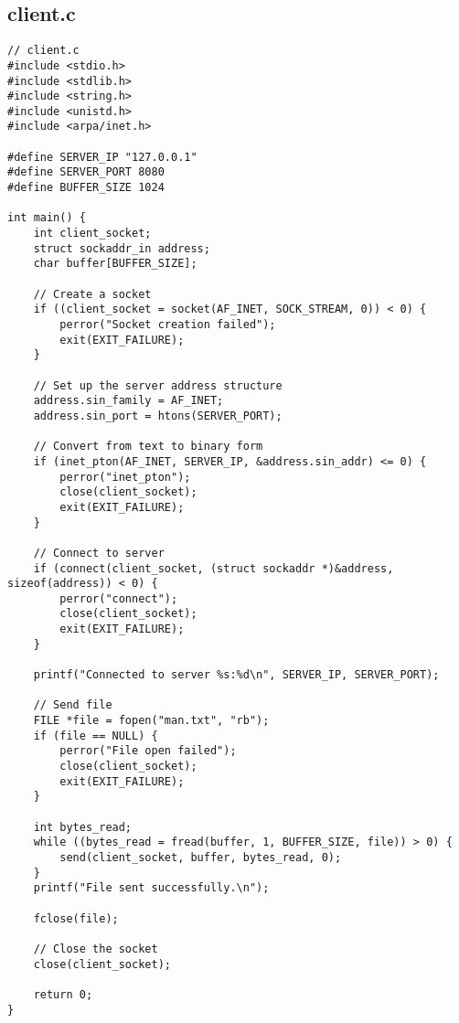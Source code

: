 \documentclass{article}
\begin{document}
\subsection{client.c}
\begin{lstlisting}
// client.c
#include <stdio.h>
#include <stdlib.h>
#include <string.h>
#include <unistd.h>
#include <arpa/inet.h>

#define SERVER_IP "127.0.0.1" 
#define SERVER_PORT 8080
#define BUFFER_SIZE 1024

int main() {
    int client_socket;
    struct sockaddr_in address;
    char buffer[BUFFER_SIZE];

    // Create a socket
    if ((client_socket = socket(AF_INET, SOCK_STREAM, 0)) < 0) {
        perror("Socket creation failed");
        exit(EXIT_FAILURE);
    }

    // Set up the server address structure
    address.sin_family = AF_INET;
    address.sin_port = htons(SERVER_PORT);

    // Convert from text to binary form
    if (inet_pton(AF_INET, SERVER_IP, &address.sin_addr) <= 0) {
        perror("inet_pton");
        close(client_socket);
        exit(EXIT_FAILURE);
    }

    // Connect to server
    if (connect(client_socket, (struct sockaddr *)&address, sizeof(address)) < 0) {
        perror("connect");
        close(client_socket);
        exit(EXIT_FAILURE);
    }
    
    printf("Connected to server %s:%d\n", SERVER_IP, SERVER_PORT);

    // Send file
    FILE *file = fopen("man.txt", "rb");
    if (file == NULL) {
        perror("File open failed");
        close(client_socket);
        exit(EXIT_FAILURE);
    }

    int bytes_read;
    while ((bytes_read = fread(buffer, 1, BUFFER_SIZE, file)) > 0) {
        send(client_socket, buffer, bytes_read, 0);
    }
    printf("File sent successfully.\n");

    fclose(file);

    // Close the socket
    close(client_socket);

    return 0;
}
\end{lstlisting}
\end{document}
